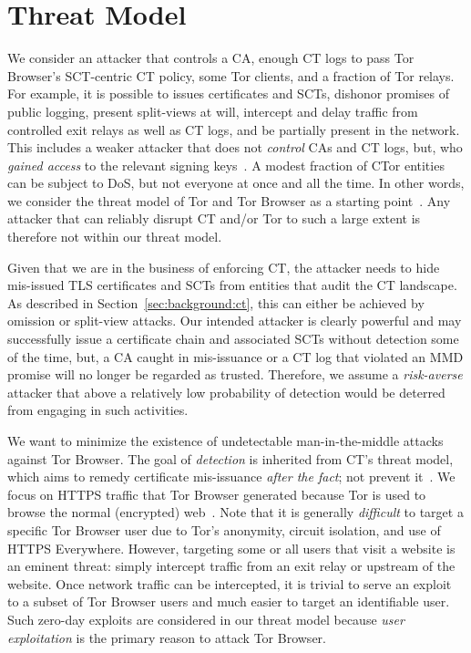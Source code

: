 \section{Threat Model} \label{sec:adversary}
%
%
We consider an attacker that controls
	a CA,
	enough CT logs to pass Tor Browser's SCT-centric CT policy, 
	some Tor clients, and
	a fraction of Tor relays.
For example, it is possible to
	issues certificates and SCTs,
	dishonor promises of public logging,
	present split-views at will,
	intercept and delay traffic from controlled exit relays as well as CT logs,
		and
	be partially present in the network.
This includes a weaker attacker that does not \emph{control} CAs and CT logs,
but, who \emph{gained access} to the relevant signing keys~\cite{turktrust,%
gdca1-omission}.  A modest fraction of CTor entities can be subject to DoS, but
not everyone at once and all the time.  In other words, we consider the threat
model of Tor and Tor Browser as a starting point~\cite{tor,tor-browser}.  Any
attacker that can reliably disrupt CT and/or Tor to such a large extent is
therefore not within our threat model.

%
%
Given that we are in the business of enforcing CT, the attacker needs to hide
mis-issued TLS certificates and SCTs from entities that audit the CT landscape.
As described in Section~\ref{sec:background:ct}, this can either be achieved by
omission or split-view attacks.  Our intended attacker is clearly powerful and may
successfully issue a certificate chain and associated SCTs without detection
some of the time, but, a CA caught in mis-issuance or a CT log that violated an
MMD promise will no longer be regarded as trusted.  Therefore, we assume a
\emph{risk-averse} attacker that above a relatively low probability of detection
would be deterred from engaging in such activities.

%
%
We want to minimize the existence of undetectable man-in-the-middle attacks
against Tor Browser.  The goal of \emph{detection} is inherited
from CT's threat model, which aims to remedy certificate mis-issuance
\emph{after the fact}; not prevent it~\cite{ct/a}.  We
focus on HTTPS traffic that Tor Browser generated because Tor is used to browse
the normal (encrypted) web~\cite{mani}.  Note that it is generally
\emph{difficult} to target a specific Tor Browser user due to Tor's anonymity,
circuit isolation, and use of HTTPS Everywhere.  However, targeting some or all 
users that visit a website is an eminent threat:
	simply intercept traffic from an exit relay or
	upstream of the website.
Once network traffic can be intercepted, it is trivial to serve an exploit to a
subset of Tor Browser users and much easier to target an identifiable user.
Such zero-day exploits are considered in our threat model because \emph{user
exploitation} is the primary reason to attack Tor Browser.

